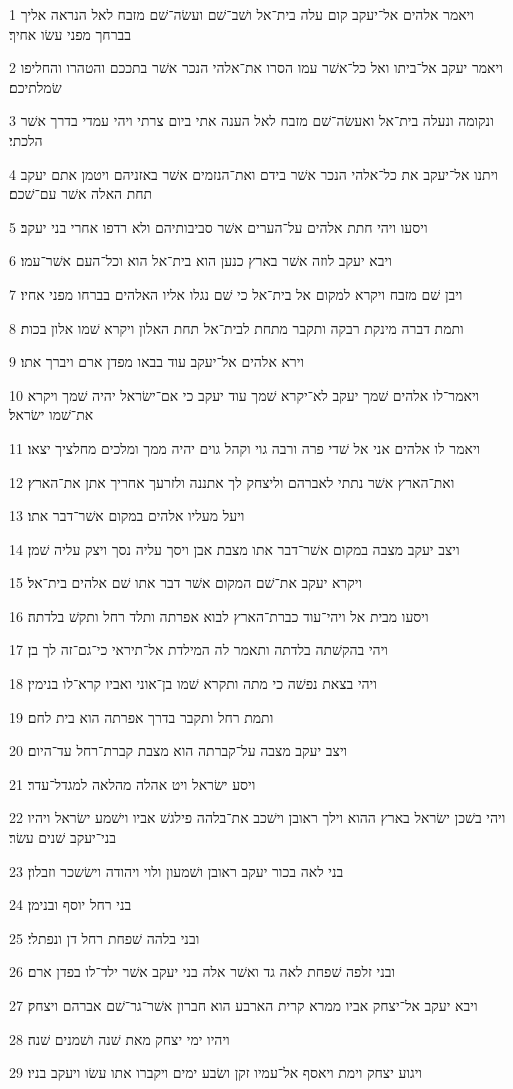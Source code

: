 \par 1 ויאמר אלהים אל־יעקב קום עלה בית־אל ושׁב־שׁם ועשׂה־שׁם מזבח לאל הנראה אליך בברחך מפני עשׂו אחיך׃
\par 2 ויאמר יעקב אל־ביתו ואל כל־אשׁר עמו הסרו את־אלהי הנכר אשׁר בתככם והטהרו והחליפו שׂמלתיכם׃
\par 3 ונקומה ונעלה בית־אל ואעשׂה־שׁם מזבח לאל הענה אתי ביום צרתי ויהי עמדי בדרך אשׁר הלכתי׃
\par 4 ויתנו אל־יעקב את כל־אלהי הנכר אשׁר בידם ואת־הנזמים אשׁר באזניהם ויטמן אתם יעקב תחת האלה אשׁר עם־שׁכם׃
\par 5 ויסעו ויהי חתת אלהים על־הערים אשׁר סביבותיהם ולא רדפו אחרי בני יעקב׃
\par 6 ויבא יעקב לוזה אשׁר בארץ כנען הוא בית־אל הוא וכל־העם אשׁר־עמו׃
\par 7 ויבן שׁם מזבח ויקרא למקום אל בית־אל כי שׁם נגלו אליו האלהים בברחו מפני אחיו׃
\par 8 ותמת דברה מינקת רבקה ותקבר מתחת לבית־אל תחת האלון ויקרא שׁמו אלון בכות׃
\par 9 וירא אלהים אל־יעקב עוד בבאו מפדן ארם ויברך אתו׃
\par 10 ויאמר־לו אלהים שׁמך יעקב לא־יקרא שׁמך עוד יעקב כי אם־ישׂראל יהיה שׁמך ויקרא את־שׁמו ישׂראל׃
\par 11 ויאמר לו אלהים אני אל שׁדי פרה ורבה גוי וקהל גוים יהיה ממך ומלכים מחלציך יצאו׃
\par 12 ואת־הארץ אשׁר נתתי לאברהם וליצחק לך אתננה ולזרעך אחריך אתן את־הארץ׃
\par 13 ויעל מעליו אלהים במקום אשׁר־דבר אתו׃
\par 14 ויצב יעקב מצבה במקום אשׁר־דבר אתו מצבת אבן ויסך עליה נסך ויצק עליה שׁמן׃
\par 15 ויקרא יעקב את־שׁם המקום אשׁר דבר אתו שׁם אלהים בית־אל׃
\par 16 ויסעו מבית אל ויהי־עוד כברת־הארץ לבוא אפרתה ותלד רחל ותקשׁ בלדתה׃
\par 17 ויהי בהקשׁתה בלדתה ותאמר לה המילדת אל־תיראי כי־גם־זה לך בן׃
\par 18 ויהי בצאת נפשׁה כי מתה ותקרא שׁמו בן־אוני ואביו קרא־לו בנימין׃
\par 19 ותמת רחל ותקבר בדרך אפרתה הוא בית לחם׃
\par 20 ויצב יעקב מצבה על־קברתה הוא מצבת קברת־רחל עד־היום׃
\par 21 ויסע ישׂראל ויט אהלה מהלאה למגדל־עדר׃
\par 22 ויהי בשׁכן ישׂראל בארץ ההוא וילך ראובן וישׁכב את־בלהה פילגשׁ אביו וישׁמע ישׂראל ויהיו בני־יעקב שׁנים עשׂר׃
\par 23 בני לאה בכור יעקב ראובן ושׁמעון ולוי ויהודה וישׂשכר וזבלון׃
\par 24 בני רחל יוסף ובנימן׃
\par 25 ובני בלהה שׁפחת רחל דן ונפתלי׃
\par 26 ובני זלפה שׁפחת לאה גד ואשׁר אלה בני יעקב אשׁר ילד־לו בפדן ארם׃
\par 27 ויבא יעקב אל־יצחק אביו ממרא קרית הארבע הוא חברון אשׁר־גר־שׁם אברהם ויצחק׃
\par 28 ויהיו ימי יצחק מאת שׁנה ושׁמנים שׁנה׃
\par 29 ויגוע יצחק וימת ויאסף אל־עמיו זקן ושׂבע ימים ויקברו אתו עשׂו ויעקב בניו׃

